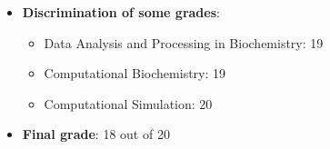 \begin{itemize}
    \item \textbf{Discrimination of some grades}:
    \begin{itemize}
        \item Data Analysis and Processing in Biochemistry: 19
        \item Computational Biochemistry: 19
        \item Computational Simulation: 20
    \end{itemize}
    \item \textbf{Final grade}: 18 out of 20
\end{itemize}
